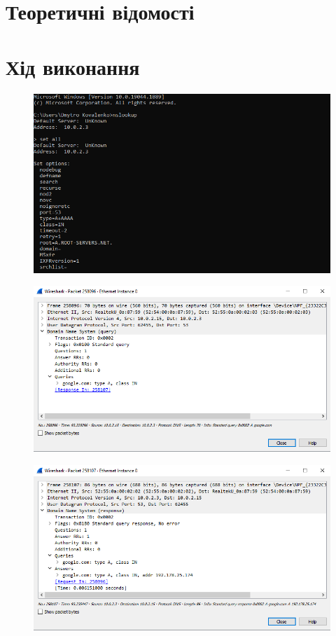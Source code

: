 \documentclass{article}
\begin{document}
\begin{normalsize}
\section*{Теоретичні відомості}

\section*{Хід виконання}

\begin{figure}[H]
	\centering
	\includegraphics{0}
	\caption{}
\end{figure}
 
 \begin{figure}[H]
 	\centering
 	\includegraphics{11}
 	\caption{}
 \end{figure}

\begin{figure}[H]
	\centering
	\includegraphics{12}
	\caption{}
\end{figure}


\end{normalsize}
\end{document}
